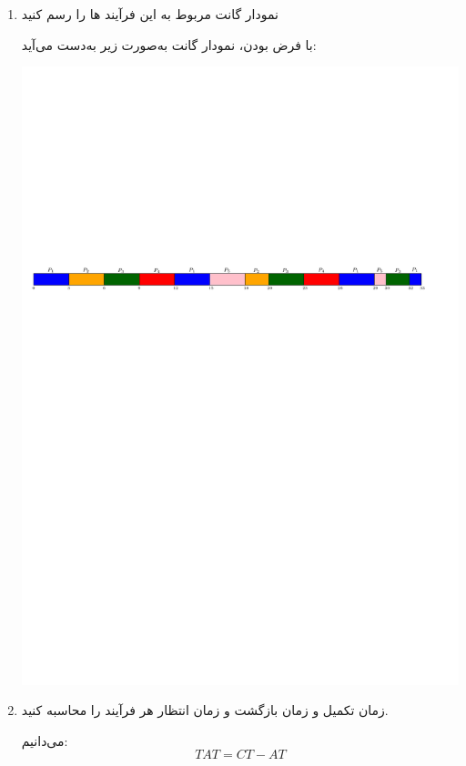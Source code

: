 \begin{enumerate}
	\item 
	نمودار گانت مربوط به این فرآیند ها را رسم کنید
	
	\begin{qsolve}
		با فرض  بودن، نمودار گانت به‌صورت زیر به‌دست می‌آید:
		
		
		\begin{center}
			\includegraphics*[width=1\linewidth]{pics/Q2.pdf}
		\end{center}
	\end{qsolve}
	
	
	\item 
	زمان تکمیل  و زمان بازگشت  و زمان انتظار  هر فرآیند را محاسبه کنید.
	
	\begin{qsolve}
		می‌دانیم:
		$$ TAT = CT - AT $$
		

\end{qsolve}
\end{enumerate}

